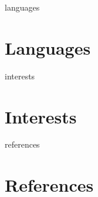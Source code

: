 \documentclass[12pt]{report} %
\begin{document}
\ifcsname languages\endcsname%
\section{Languages}
\languages{}
\fi



\ifcsname interests\endcsname%
\section{Interests}
\interests{}
\fi



\ifcsname references\endcsname%
\section{References}
\fi


\end{document}
